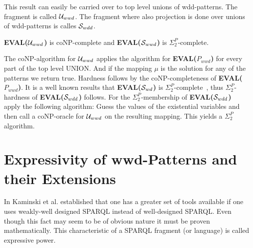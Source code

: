 This result can easily be carried over to top level unions of wdd-patterns. The fragment
is called $\mathcal{U}_{wwd}$. The fragment where also projection is done over unions of
wdd-patterns is calles $\mathcal{S}_{wdd}$.

\begin{corollary}
	\textbf{EVAL($\mathcal{U}_{wwd}$)} is coNP-complete and \textbf{EVAL($\mathcal{S}_{wwd}$)} is
	$\Sigma^P_2$-complete.
\end{corollary}
\begin{proofidea}
	The coNP-algorithm for $\mathcal{U}_{wwd}$  applies the
	algorithm for \textbf{EVAL($P_{wwd}$)} for every part of the top level UNION. And
	if the mapping $\mu$ is the solution for any of the patterns we return
	true. Hardness follows by the coNP-completeness of \textbf{EVAL($P_{wwd}$)}.
	It is a well known results that \textbf{EVAL($\mathcal{S}_{wd}$)} is
	$\Sigma^P_2$-complete~\cite{letelier2013static},
	thus $\Sigma^P_2$-hardness of \textbf{EVAL($\mathcal{S}_{wdd}$)} follows. 
	For the $\Sigma^P_2$-membership of \textbf{EVAL($\mathcal{S}_{wdd}$)} apply the following algorithm:
	Guess the values of the existential variables and then call a coNP-oracle
	for $\mathcal{U}_{wwd}$ on the resulting mapping. This yields a $\Sigma^P_2$ algorithm.
\end{proofidea}

\section{Expressivity of wwd-Patterns and their Extensions}
In \cite{kaminski_bwd} Kaminski et al. established that one has a greater set
of tools available if one uses weakly-well designed SPARQL instead of
well-designed SPARQL. Even though this fact may seem to be of obvious nature it
must be proven mathematically. This characteristic of a SPARQL fragment (or
language) is called expressive power.

